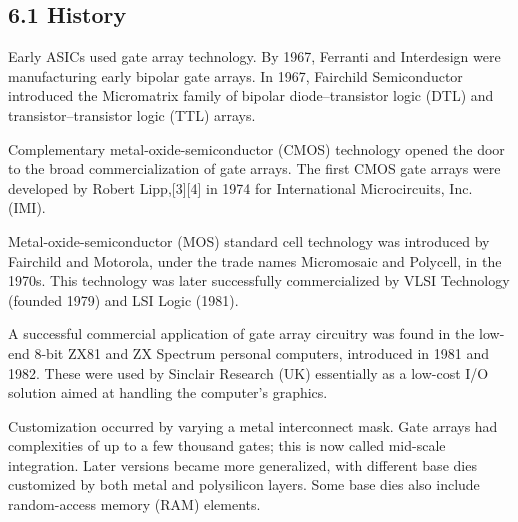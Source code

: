 \subsection*{6.1 History}
Early ASICs used gate array technology. By 1967, Ferranti and Interdesign were manufacturing early bipolar gate arrays. In 1967, Fairchild Semiconductor introduced the Micromatrix family of bipolar diode–transistor logic (DTL) and transistor–transistor logic (TTL) arrays.\vspace{.3cm}

Complementary metal-oxide-semiconductor (CMOS) technology opened the door to the broad commercialization of gate arrays. The first CMOS gate arrays were developed by Robert Lipp,[3][4] in 1974 for International Microcircuits, Inc. (IMI).\vspace{.3cm}

Metal-oxide-semiconductor (MOS) standard cell technology was introduced by Fairchild and Motorola, under the trade names Micromosaic and Polycell, in the 1970s. This technology was later successfully commercialized by VLSI Technology (founded 1979) and LSI Logic (1981).\vspace{.3cm}

A successful commercial application of gate array circuitry was found in the low-end 8-bit ZX81 and ZX Spectrum personal computers, introduced in 1981 and 1982. These were used by Sinclair Research (UK) essentially as a low-cost I/O solution aimed at handling the computer's graphics.\vspace{.3cm}

Customization occurred by varying a metal interconnect mask. Gate arrays had complexities of up to a few thousand gates; this is now called mid-scale integration. Later versions became more generalized, with different base dies customized by both metal and polysilicon layers. Some base dies also include random-access memory (RAM) elements.\vspace{.3cm}